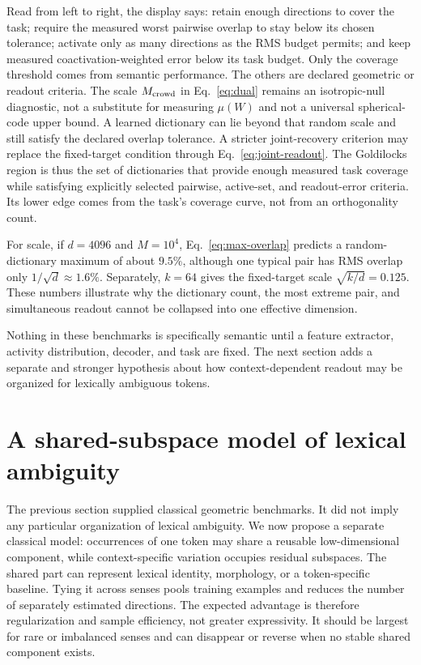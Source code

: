 \documentclass[
  aps,
  reprint,
  superscriptaddress,
  floatfix,
  nofootinbib,
  longbibliography
]{revtex4-2}
\newcommand{\Msem}{M}
\begin{document}
Read from left to right, the display says: retain enough directions to cover
the task; require the measured worst pairwise overlap to stay below its chosen
tolerance; activate only as many directions as the RMS budget permits; and
keep measured coactivation-weighted error below its task budget.  Only the
coverage threshold comes from semantic performance.  The others are declared
geometric or readout criteria.
The scale $M_{\rm crowd}$ in Eq.~\eqref{eq:dual} remains an isotropic-null
diagnostic, not a substitute for measuring $\mu(W)$ and not a universal
spherical-code upper bound.  A learned dictionary can lie beyond that random
scale and still satisfy the declared overlap tolerance.  A stricter
joint-recovery criterion may replace the fixed-target condition through
Eq.~\eqref{eq:joint-readout}.  The Goldilocks region is thus the set of
dictionaries that provide enough measured task coverage while satisfying
explicitly selected pairwise, active-set, and readout-error criteria.  Its
lower edge comes from the task's coverage curve, not from an orthogonality
count.

For scale, if $d=4096$ and $\Msem=10^4$, Eq.~\eqref{eq:max-overlap} predicts a
random-dictionary maximum of about $9.5\%$, although one typical pair has RMS
overlap only $1/\sqrt d\approx1.6\%$.  Separately, $k=64$ gives the
fixed-target scale $\sqrt{k/d}=0.125$.  These numbers illustrate why the
dictionary count, the most extreme pair, and simultaneous readout cannot be
collapsed into one effective dimension.

Nothing in these benchmarks is specifically semantic until a feature
extractor, activity distribution, decoder, and task are fixed.  The next
section adds a separate and stronger hypothesis about how context-dependent
readout may be organized for lexically ambiguous tokens.

\section{A shared-subspace model of lexical ambiguity}
\label{sec:reference}

The previous section supplied classical geometric benchmarks.  It did not
imply any particular organization of lexical ambiguity.  We now propose a
separate classical model: occurrences of one token may share a reusable
low-dimensional component, while context-specific variation occupies residual
subspaces.  The shared part can represent lexical identity, morphology, or a
token-specific baseline.  Tying it across senses pools training examples and
reduces the number of separately estimated directions.  The expected advantage
is therefore regularization and sample efficiency, not greater expressivity.
It should be largest for rare or imbalanced senses and can disappear or reverse
when no stable shared component exists.
\end{document}

